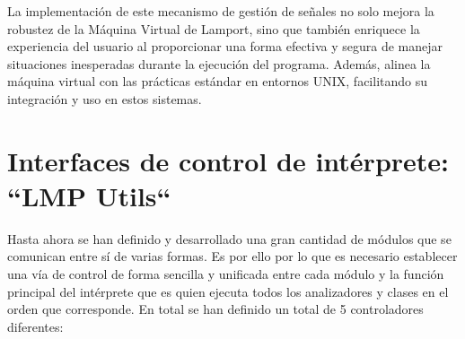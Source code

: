 La implementación de este mecanismo de gestión de señales no solo mejora la robustez de la Máquina Virtual de Lamport, sino que también enriquece la experiencia del usuario al proporcionar una forma efectiva y segura de manejar situaciones inesperadas durante la ejecución del programa. Además, alinea la máquina virtual con las prácticas estándar en entornos UNIX, facilitando su integración y uso en estos sistemas.

\section{Interfaces de control de intérprete: ``LMP Utils``}\label{sec:implementacionLMPUtils}
Hasta ahora se han definido y desarrollado una gran cantidad de módulos que se comunican entre sí de varias formas. Es por ello por lo que es necesario establecer una vía de control de forma sencilla y unificada entre cada módulo y la función principal del intérprete que es quien ejecuta todos los analizadores y clases en el orden que corresponde. En total se han definido un total de 5 controladores diferentes:

